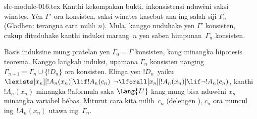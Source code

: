 \begin{filecontents*}[overwrite]{slc-module-016.tex}
Kanthi kekompakan bukti, inkonsistensi nduwèni saksi winates.
Yèn $\Gamma'$ ora konsisten, saksi winates kasebut ana ing
salah siji $\Gamma_n$ (Gladhen: terangna cara milih $n$). Mula, kanggo nuduhake yen
$\Gamma'$ konsisten, cukup dituduhake kanthi induksi marang~$n$ yen
saben himpunan~$\Gamma_n$ konsisten.

Basis induksine mung pratelan yen $\Gamma_0 = \Gamma$ konsisten, kang
minangka hipotesis teorema. Kanggo langkah induksi, upamana
$\Gamma_{n}$ konsisten nanging $\Gamma_{n+1} = \Gamma_n \cup
\{!D_n\}$ ora konsisten. Elinga yen $!D_n$~yaiku
{$\lexists[x_{n}][!A_{n}(x_n)] \lif !A_{n}(c_{n})$}
{$\lnot\lforall[x_{n}][!A_{n}(x_n)] \lif \lnot !A_{n}(c_{n})$},
kanthi $!A_n(x_n)$ minangka !!a{formula} saka $\Lang{L'}$ kang mung
bisa nduwèni $x_n$ minangka variabel bébas. Miturut cara kita milih~$c_n$
(delengen ), $c_n$ ora muncul ing~$!A_n(x_n)$
utawa ing~$\Gamma_n$.


\end{filecontents*}
